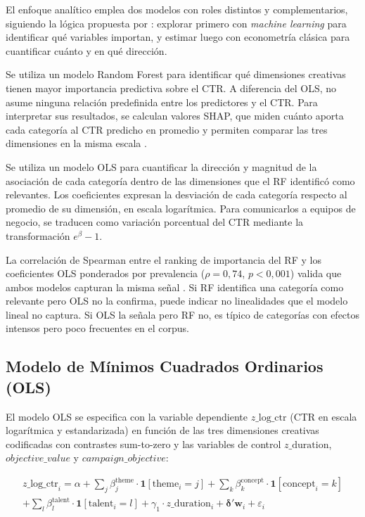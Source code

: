 \documentclass[12pt, a4paper]{report}
\begin{document}
El enfoque analítico emplea dos modelos con roles distintos y complementarios, siguiendo
la lógica propuesta por \citet{mullainathan2017}: explorar primero con \textit{machine learning} para identificar qué variables importan, y estimar luego con econometría
clásica para cuantificar cuánto y en qué dirección.

Se utiliza un modelo Random Forest para identificar qué dimensiones creativas tienen
mayor importancia predictiva sobre el CTR. A diferencia del OLS, no asume ninguna
relación predefinida entre los predictores y el CTR. Para interpretar sus resultados,
se calculan valores SHAP, que miden cuánto aporta cada categoría al CTR predicho en
promedio y permiten comparar las tres dimensiones en la misma escala
\citep{lundberg2017, strobl2007}.

Se utiliza un modelo OLS para
cuantificar la dirección y magnitud de la asociación de cada categoría dentro de las
dimensiones que el RF identificó como relevantes. Los coeficientes expresan la desviación
de cada categoría respecto al promedio de su dimensión, en escala logarítmica. Para
comunicarlos a equipos de negocio, se traducen como variación porcentual
del CTR mediante la transformación $e^{\beta} - 1$.

La correlación de Spearman entre el ranking de importancia del RF y los coeficientes OLS
ponderados por prevalencia ($\rho = 0{,}74$, $p < 0{,}001$) valida que ambos modelos
capturan la misma señal \citep{breiman2001b}. Si RF identifica una categoría como
relevante pero OLS no la confirma, puede indicar no linealidades que el modelo lineal no
captura. Si OLS la señala pero RF no, es típico de categorías con efectos intensos pero
poco frecuentes en el corpus.

\subsection{Modelo de Mínimos Cuadrados Ordinarios (OLS)}

El modelo OLS se especifica con la variable dependiente $z\_\text{log\_ctr}$ (CTR en escala
logarítmica y estandarizada) en función de las tres dimensiones creativas codificadas con
contrastes sum-to-zero y las variables de control $z\_\text{duration}$,
$\textit{objective\_value}$ y $\textit{campaign\_objective}$:

\begin{multline}
  z\_\text{log\_ctr}_i = \alpha
    + \sum_{j} \beta_j^{\text{theme}} \cdot \mathbf{1}[\text{theme}_i = j]
    + \sum_{k} \beta_k^{\text{concept}} \cdot \mathbf{1}[\text{concept}_i = k] \\
    + \sum_{l} \beta_l^{\text{talent}} \cdot \mathbf{1}[\text{talent}_i = l]
    + \gamma_1 \cdot z\_\text{duration}_i
    + \boldsymbol{\delta}' \mathbf{w}_i
    + \varepsilon_i
\end{multline}
\end{document}
